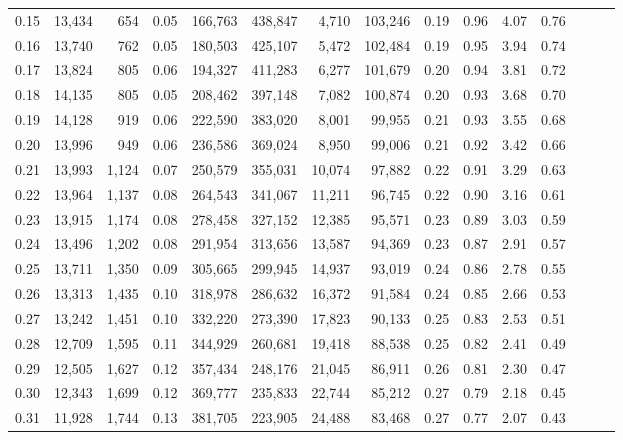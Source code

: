 \begin{tabular}{rrrrrrrrrrrrrrr}
0.15 &  13,434 &    654 &  0.05 &  166,763 &  438,847 &    4,710 &  103,246 &  0.19 &  0.96 &  4.07 &      0.76 \\
0.16 &  13,740 &    762 &  0.05 &  180,503 &  425,107 &    5,472 &  102,484 &  0.19 &  0.95 &  3.94 &      0.74 \\
0.17 &  13,824 &    805 &  0.06 &  194,327 &  411,283 &    6,277 &  101,679 &  0.20 &  0.94 &  3.81 &      0.72 \\
0.18 &  14,135 &    805 &  0.05 &  208,462 &  397,148 &    7,082 &  100,874 &  0.20 &  0.93 &  3.68 &      0.70 \\
0.19 &  14,128 &    919 &  0.06 &  222,590 &  383,020 &    8,001 &   99,955 &  0.21 &  0.93 &  3.55 &      0.68 \\
0.20 &  13,996 &    949 &  0.06 &  236,586 &  369,024 &    8,950 &   99,006 &  0.21 &  0.92 &  3.42 &      0.66 \\
0.21 &  13,993 &  1,124 &  0.07 &  250,579 &  355,031 &   10,074 &   97,882 &  0.22 &  0.91 &  3.29 &      0.63 \\
0.22 &  13,964 &  1,137 &  0.08 &  264,543 &  341,067 &   11,211 &   96,745 &  0.22 &  0.90 &  3.16 &      0.61 \\
0.23 &  13,915 &  1,174 &  0.08 &  278,458 &  327,152 &   12,385 &   95,571 &  0.23 &  0.89 &  3.03 &      0.59 \\
0.24 &  13,496 &  1,202 &  0.08 &  291,954 &  313,656 &   13,587 &   94,369 &  0.23 &  0.87 &  2.91 &      0.57 \\
0.25 &  13,711 &  1,350 &  0.09 &  305,665 &  299,945 &   14,937 &   93,019 &  0.24 &  0.86 &  2.78 &      0.55 \\
0.26 &  13,313 &  1,435 &  0.10 &  318,978 &  286,632 &   16,372 &   91,584 &  0.24 &  0.85 &  2.66 &      0.53 \\
0.27 &  13,242 &  1,451 &  0.10 &  332,220 &  273,390 &   17,823 &   90,133 &  0.25 &  0.83 &  2.53 &      0.51 \\
0.28 &  12,709 &  1,595 &  0.11 &  344,929 &  260,681 &   19,418 &   88,538 &  0.25 &  0.82 &  2.41 &      0.49 \\
0.29 &  12,505 &  1,627 &  0.12 &  357,434 &  248,176 &   21,045 &   86,911 &  0.26 &  0.81 &  2.30 &      0.47 \\
0.30 &  12,343 &  1,699 &  0.12 &  369,777 &  235,833 &   22,744 &   85,212 &  0.27 &  0.79 &  2.18 &      0.45 \\
0.31 &  11,928 &  1,744 &  0.13 &  381,705 &  223,905 &   24,488 &   83,468 &  0.27 &  0.77 &  2.07 &      0.43 \\

\end{tabular}
